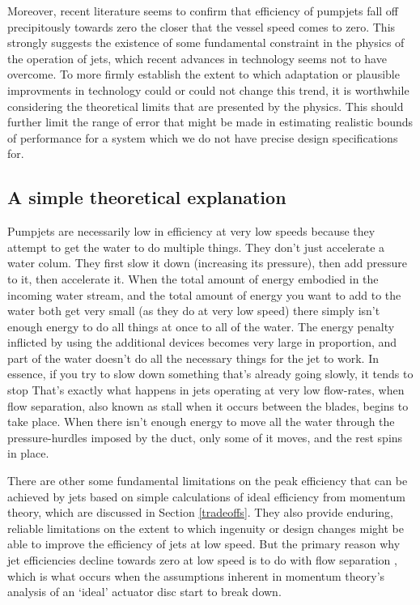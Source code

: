 \documentclass{article}\usepackage[]{graphicx}\usepackage[]{color}
\begin{document}
Moreover, recent literature seems to confirm that efficiency of pumpjets fall off precipitously towards zero the closer that the vessel speed comes to zero.  This strongly suggests the existence of some fundamental constraint in the physics of the operation of jets, which recent advances in technology seems not to have overcome.  To more firmly establish the extent to which adaptation or plausible improvments in technology could or could not change this trend, it is worthwhile considering the theoretical limits that are presented by the physics.  This should further limit the range of error that might be made in estimating realistic bounds of performance for a system which we do not have precise design specifications for.

\subsection{A simple theoretical explanation}

Pumpjets are necessarily low in efficiency at very low speeds because they attempt to get the water to do multiple things.  They don't just accelerate a water colum.  They first slow it down (increasing its pressure), then add pressure to it, then accelerate it.  When the total amount of energy embodied in the incoming water stream, and the total amount of energy you want to add to the water both get very small (as they do at very low speed) there simply isn't enough energy to do all things at once to all of the water.  The energy penalty inflicted by using the additional devices becomes very large in proportion, and part of the water doesn't do all the necessary things for the jet to work.  In essence, if you try to slow down something that's already going slowly, it tends to stop  That's exactly what happens in jets operating at very low flow-rates, when flow separation, also known as stall when it occurs between the blades, begins to take place.  When there isn't enough energy to move all the water through the pressure-hurdles imposed by the duct, only some of it moves, and the rest spins in place.

There are other some fundamental limitations on the peak efficiency that can be achieved by jets based on simple calculations of ideal efficiency from momentum theory, which are discussed in Section \ref{tradeoffs}.  They also provide enduring, reliable limitations on the extent to which ingenuity or design changes might be able to improve the efficiency of jets at low speed. But the primary reason why jet efficiencies decline towards zero at low speed is to do with flow separation \parencite{fujisawa1995}, which is what occurs when the assumptions inherent in momentum theory's analysis of an `ideal' actuator disc start to break down.
\end{document}
